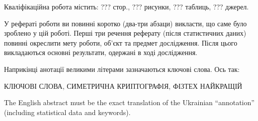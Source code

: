 
\abstractUkr

Кваліфікаційна робота містить: ??? стор., ??? рисунки, ??? таблиць, ??? джерел.

У рефераті роботи ви повинні коротко (два-три абзаци) викласти, що саме
було зроблено у цій роботі. Перші три речення реферату (після статистичних
даних) повинні окреслити мету роботи, об'єкт та предмет дослідження. Після
цього викладаються основні результати, одержані в ході дослідження.

Наприкінці анотації великими літерами зазначаються ключові слова. Ось так:

\MakeUppercase{КЛЮЧОВІ СЛОВА, СИМЕТРИЧНА КРИПТОГРАФІЯ, ФІЗТЕХ НАЙКРАЩІЙ}

%

\abstractEng

The English abstract must be the exact translation of the Ukrainian
``annotation'' (including statistical data and keywords).

\clearpage